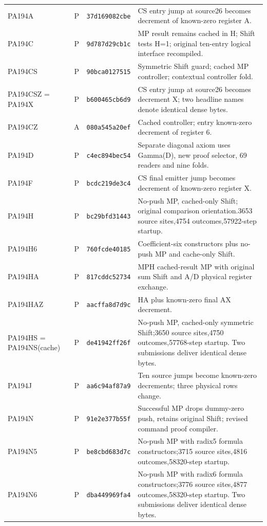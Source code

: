 \begin{longtable}{@{}>{\raggedright\arraybackslash}p{}cp{}>{\raggedright\arraybackslash}p{}@{}}
PA194A & P & \texttt{37d169082cbe} & CS entry jump at source26 becomes decrement of known-zero register A.\\[3pt]
PA194C & P & \texttt{9d787d29cb1c} & MP result remains cached in H; Shift tests H=1; original ten-entry logical interface recompiled.\\[3pt]
PA194CS & P & \texttt{90bca0127515} & Symmetric Shift guard; cached MP controller; contextual controller fold.\\[3pt]
PA194CSZ = PA194X & P & \texttt{b600465cb6d9} & CS entry jump at source26 becomes decrement X; two headline names denote identical dense bytes.\\[3pt]
PA194CZ & A & \texttt{080a545a20ef} & Cached controller; entry known-zero decrement of register 6.\\[3pt]
PA194D & P & \texttt{c4ec894bec54} & Separate diagonal axiom uses Gamma(D), new proof selector, 69 readers and nine folds.\\[3pt]
PA194F & P & \texttt{bcdc219de3c4} & CS final emitter jump becomes decrement of known-zero register X.\\[3pt]
PA194H & P & \texttt{bc29bfd31443} & No-push MP, cached-only Shift; original comparison orientation.3653 source sites,4754 outcomes,57922-step startup.\\[3pt]
PA194H6 & P & \texttt{760fcde40185} & Coefficient-six constructors plus no-push MP and cache-only Shift.\\[3pt]
PA194HA & P & \texttt{817cddc52734} & MPH cached-result MP with original sum Shift and A/D physical register exchange.\\[3pt]
PA194HAZ & P & \texttt{aacffa8d7d9c} & HA plus known-zero final AX decrement.\\[3pt]
PA194HS = PA194NS(cache) & P & \texttt{de41942ff26f} & No-push MP, cached-only symmetric Shift;3650 source sites,4750 outcomes,57768-step startup. Two submissions deliver identical dense bytes.\\[3pt]
PA194J & P & \texttt{aa6c94af87a9} & Ten source jumps become known-zero decrements; three physical rows change.\\[3pt]
PA194N & P & \texttt{91e2e377b55f} & Successful MP drops dummy-zero push, retains original Shift; revised command proof compiler.\\[3pt]
PA194N5 & P & \texttt{be8cbd683d7c} & No-push MP with radix5 formula constructors;3715 source sites,4816 outcomes,58320-step startup.\\[3pt]
PA194N6 & P & \texttt{dba449969fa4} & No-push MP with radix6 formula constructors;3776 source sites,4877 outcomes,58320-step startup. Two submissions deliver identical dense bytes.\\[3pt]

\end{longtable}
